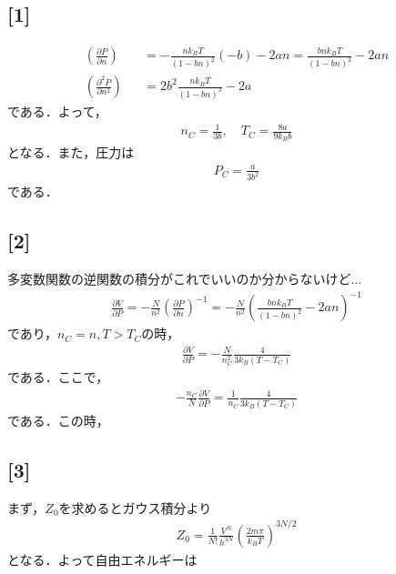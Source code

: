 \documentclass[12pt,dvipdfmx]{jsarticle}
\begin{document}
\subsection*{\large{[1]}}
\begin{eqnarray}
  \left( \frac{\partial P}{\partial n} \right)&&= -\frac{nk_BT}{(1-bn)^2}(-b)-2an = \frac{bnk_BT}{(1-bn)^2}-2an\\
  \left( \frac{\partial^2 P}{\partial n^2} \right)&&= 2b^2\frac{nk_BT}{(1-bn)^3}-2a
\end{eqnarray}
である．よって，
\begin{eqnarray}
  n_C =\frac{1}{3b}, \quad T_C = \frac{8a}{9k_B b}
\end{eqnarray}
となる．また，圧力は
\begin{eqnarray}
  P_C = \frac{a}{3b^2}
\end{eqnarray}
である．
\subsection*{\large{[2]}}
多変数関数の逆関数の積分がこれでいいのか分からないけど...
\begin{eqnarray}
  \frac{\partial V}{\partial P} = -\frac{N}{n^2}\left( \frac{\partial P}{\partial n} \right)^{-1} = -\frac{N}{n^2}\left( \frac{bnk_BT}{(1-bn)^2}-2an \right)^{-1}
\end{eqnarray}
であり，$n_C=n, T>T_C$の時，
\begin{eqnarray}
  \frac{\partial V}{\partial P}=-\frac{N}{n_C^2} \frac{4}{3k_B(T-T_C)}
\end{eqnarray}
である．ここで，
\begin{eqnarray}
  -\frac{n_C}{N}\frac{\partial V}{\partial P} = \frac{1}{n_C} \frac{4}{3k_B(T-T_C)}
\end{eqnarray}
である．この時，
\subsection*{\large{[3]}}
まず，$Z_0$を求めるとガウス積分より
\begin{eqnarray}
  Z_0 = \frac{1}{N!}\frac{V^{N}}{h^{3N}}\left( \frac{2m\pi}{k_B T} \right)^{3N/2}
\end{eqnarray}
となる．よって自由エネルギーは
\begin{eqnarray}
  
\end{eqnarray}
\end{document}
